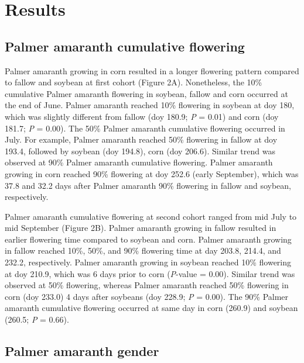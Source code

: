 \documentclass[utf8]{frontiersSCNS}
\begin{document}
\hypertarget{results}{%
\section*{Results}\label{results}}

\hypertarget{palmer-amaranth-cumulative-flowering}{%
\subsection*{Palmer amaranth cumulative
flowering}\label{palmer-amaranth-cumulative-flowering}}

Palmer amaranth growing in corn resulted in a longer flowering pattern
compared to fallow and soybean at first cohort (Figure 2A). Nonetheless,
the 10\% cumulative Palmer amaranth flowering in soybean, fallow and
corn occurred at the end of June. Palmer amaranth reached 10\% flowering
in soybean at doy 180, which was slightly different from fallow (doy
180.9; \emph{P} = 0.01) and corn (doy 181.7; \emph{P} = 0.00). The 50\%
Palmer amaranth cumulative flowering occurred in July. For example,
Palmer amaranth reached 50\% flowering in fallow at doy 193.4, followed
by soybean (doy 194.8), corn (doy 206.6). Similar trend was observed at
90\% Palmer amaranth cumulative flowering. Palmer amaranth growing in
corn reached 90\% flowering at doy 252.6 (early September), which was
37.8 and 32.2 days after Palmer amaranth 90\% flowering in fallow and
soybean, respectively.

Palmer amaranth cumulative flowering at second cohort ranged from mid
July to mid September (Figure 2B). Palmer amaranth growing in fallow
resulted in earlier flowering time compared to soybean and corn. Palmer
amaranth growing in fallow reached 10\%, 50\%, and 90\% flowering time
at day 203.8, 214.4, and 232.2, respectively. Palmer amaranth growing in
soybean reached 10\% flowering at doy 210.9, which was 6 days prior to
corn (\emph{P}-value = 0.00). Similar trend was observed at 50\%
flowering, whereas Palmer amaranth reached 50\% flowering in corn (doy
233.0) 4 days after soybeans (doy 228.9; \emph{P} = 0.00). The 90\%
Palmer amaranth cumulative flowering occurred at same day in corn
(260.9) and soybean (260.5; \emph{P} = 0.66).

\hypertarget{palmer-amaranth-gender}{%
\subsection*{Palmer amaranth gender}\label{palmer-amaranth-gender}}
\end{document}
